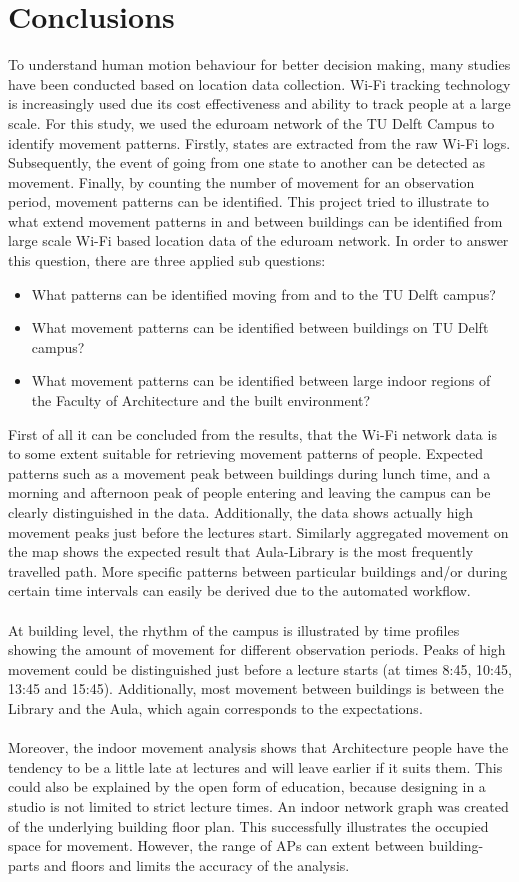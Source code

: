 \chapter{Conclusions}\label{conclusion}
To understand human motion behaviour for better decision making, many studies have been conducted based on location data collection. Wi-Fi tracking technology is increasingly used due its cost effectiveness and ability to track people at a large scale. For this study, we used the eduroam network of the TU Delft Campus to identify movement patterns. Firstly, states are extracted from the raw Wi-Fi logs.  Subsequently, the event of going from one state to another can be detected as movement. Finally, by counting the number of movement for an observation period, movement patterns can be identified. This project tried to illustrate to what extend movement patterns in and between buildings can be identified from large scale Wi-Fi based location data of the eduroam network. In order to answer this question, there are three applied sub questions:
\begin{itemize}
\item What patterns can be identified moving from and to the TU Delft campus?
\item What movement patterns can be identified between buildings on TU Delft campus?
\item What movement patterns can be identified between large indoor regions of the Faculty of Architecture and the built environment?
\end{itemize}
First of all it can be concluded from the results, that the Wi-Fi network data is to some extent suitable for retrieving movement patterns of people. Expected patterns such as a movement peak between buildings during lunch time, and a morning and afternoon peak of people entering and leaving the campus can be clearly distinguished in the data. Additionally, the data shows actually high movement peaks just before the lectures start. Similarly aggregated movement on the map shows the expected result that Aula-Library is the most frequently travelled path. More specific patterns between particular buildings and/or during certain time intervals can easily be derived due to the automated workflow.
\\\\
At building level, the rhythm of the campus is illustrated by time profiles showing the amount of movement for different observation periods. Peaks of high movement could be distinguished just before a lecture starts (at times 8:45, 10:45, 13:45 and 15:45). Additionally, most movement between buildings is between the Library and the Aula, which again corresponds to the expectations.
\\\\
Moreover, the indoor movement analysis shows that Architecture people have the tendency to be a little late at lectures and will leave earlier if it suits them. This could also be explained by the open form of education, because designing in a studio is not limited to strict lecture times. An indoor network graph was created of the underlying building floor plan. This successfully illustrates the occupied space for movement. However, the range of APs can extent between building-parts and floors and limits the accuracy of the analysis.